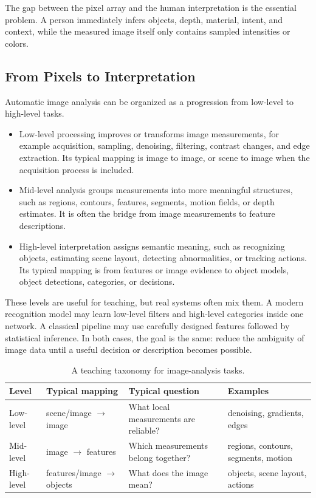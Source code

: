 The gap between the pixel array and the human interpretation is the essential
problem. A person immediately infers objects, depth, material, intent, and
context, while the measured image itself only contains sampled intensities or
colors.

\subsection{From Pixels to Interpretation}

Automatic image analysis can be organized as a progression from low-level to
high-level tasks.

\begin{itemize}
  \item Low-level processing improves or transforms image measurements, for
        example acquisition, sampling, denoising, filtering, contrast changes,
        and edge extraction. Its typical mapping is image to image, or scene to
        image when the acquisition process is included.
  \item Mid-level analysis groups measurements into more meaningful structures,
        such as regions, contours, features, segments, motion fields, or depth
        estimates. It is often the bridge from image measurements to feature
        descriptions.
  \item High-level interpretation assigns semantic meaning, such as recognizing
        objects, estimating scene layout, detecting abnormalities, or tracking
        actions. Its typical mapping is from features or image evidence to
        object models, object detections, categories, or decisions.
\end{itemize}

\noindent
These levels are useful for teaching, but real systems often mix them. A modern
recognition model may learn low-level filters and high-level categories inside
one network. A classical pipeline may use carefully designed features followed
by statistical inference. In both cases, the goal is the same: reduce the
ambiguity of image data until a useful decision or description becomes possible.

\begin{table}[ht]
  \centering
  \begin{tabular}{@{}p{2.0cm}p{3.0cm}p{4.2cm}p{4.0cm}@{}}
    \toprule
    Level & Typical mapping & Typical question & Examples \\
    \midrule
    Low-level & scene/image $\rightarrow$ image &
      What local measurements are reliable? &
      denoising, gradients, edges \\
    Mid-level & image $\rightarrow$ features &
      Which measurements belong together? &
      regions, contours, segments, motion \\
    High-level & features/image $\rightarrow$ objects &
      What does the image mean? &
      objects, scene layout, actions \\
    \bottomrule
  \end{tabular}
  \caption{A teaching taxonomy for image-analysis tasks.}
\end{table}

